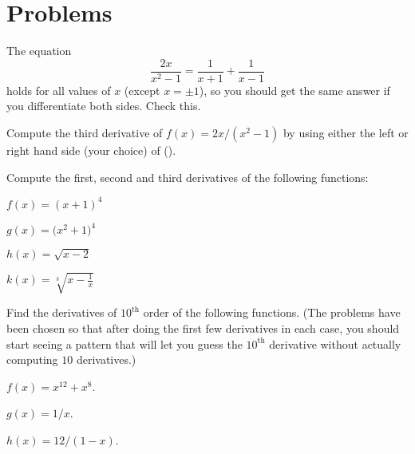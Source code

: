 \section{Problems} 
\problemfont 




\begin{multicols}{2}\setlength{\parindent}{0pt}
\problem  The equation 
\begin{equation}
  \frac{2x}{x^2-1}= \frac{1}{x+1}+\frac{1}{x-1}  \tag{\dag}
\end{equation}
holds for all values of $x$ (except $x=\pm1$), so you should get
the same answer if you differentiate both sides.  Check this.




Compute the third derivative of $f(x) = 2x/(x^2-1)$ by using either the
left or right hand side (your choice) of (\dag).




\problem Compute the first, second and third derivatives of the following 
functions:




\subprob $f(x) = (x+1)^4$




\subprob $g(x) = \bigl(x^2+1\bigr)^4$




\subprob $h(x) = \sqrt{x-2} $




\subprob $k(x) = \sqrt[3]{x-\frac1x}$
















\problem Find the derivatives of $10^\text{th}$ order of the following 
functions. (The problems have been chosen so that after doing the
first few derivatives in each case, you should start seeing a pattern
that will let you guess the $10^{\text{th}}$ derivative without
actually computing $10$ derivatives.)




\subprob $  f(x) = x^{12}+x^8 $.




\subprob $  g(x) = 1/x $.




\subprob $  h(x) = 12/(1-x)$.





\end{multicols}

